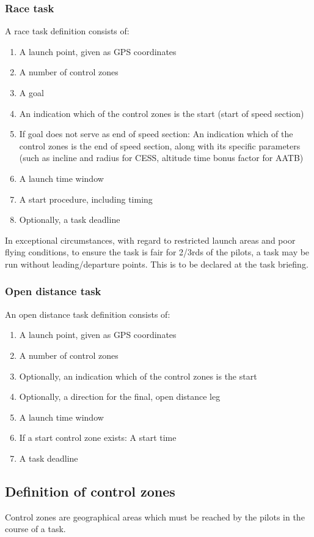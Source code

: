 \documentclass{article}
\begin{document}
\subsubsection{Race task}
A race task definition consists of:
\begin{enumerate}
    \item A launch point, given as GPS coordinates
    \item A number of control zones
    \item A goal
    \item
        An indication which of the control zones is the start (start of speed
        section)
    \item
        If goal does not serve as end of speed section: An indication which of
        the control zones is the end of speed section, along with its specific
        parameters (such as incline and radius for CESS, altitude time bonus
        factor for AATB)
    \item A launch time window
    \item A start procedure, including timing
    \item Optionally, a task deadline
\end{enumerate}

In exceptional circumstances, with regard to restricted launch areas and poor
flying conditions, to ensure the task is fair for 2/3rds of the pilots, a task
may be run without leading/departure points. This is to be declared at the task
briefing.

\subsubsection{Open distance task}
An open distance task definition consists of:
\begin{enumerate}
    \item A launch point, given as GPS coordinates
    \item A number of control zones
    \item Optionally, an indication which of the control zones is the start
    \item Optionally, a direction for the final, open distance leg
    \item A launch time window
    \item If a start control zone exists: A start time
    \item A task deadline
\end{enumerate}

\subsection{Definition of control zones}
Control zones are geographical areas which must be reached by the pilots in the
course of a task.
\end{document}
